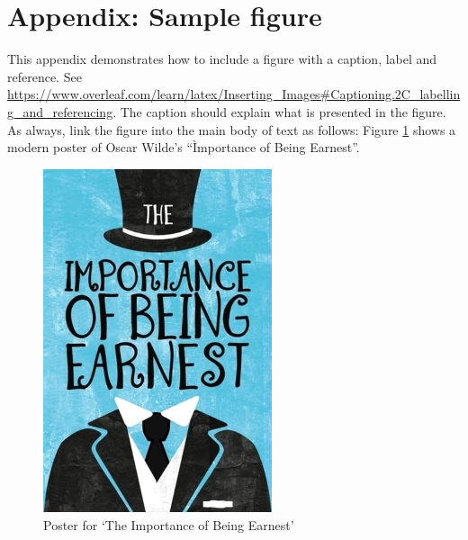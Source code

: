 \section{Appendix: Sample figure}\label{app:sample-figure}

This appendix demonstrates how to include a figure with a caption, label and reference.  See \url{https://www.overleaf.com/learn/latex/Inserting_Images#Captioning.2C_labelling_and_referencing}.  The caption should explain what is presented in the figure.  As always, link the figure into the main body of text as follows: Figure \ref{fig:poster} shows a modern poster of Oscar Wilde's ``Ìmportance of Being Earnest''.
\begin{figure}[h]
    \centering
    \includegraphics[width=0.6\textwidth]{./resources/importance-being-earnest-cover.jpg}
    \caption{Poster for `The Importance of Being Earnest'}
    \label{fig:poster}
\end{figure}

